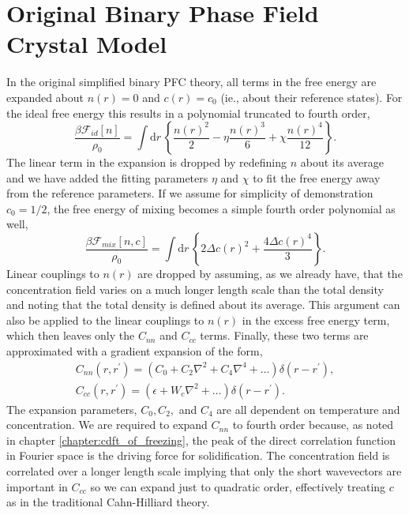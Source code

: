 \documentclass[showkeys, prb, reprint]{revtex4-1}
\renewcommand{\d}{\delta}       %
\newcommand{\F}{\mathcal{F}}    %
\renewcommand{\l}{\left}        %
\renewcommand{\r}{\right}       %
\newcommand{\f}{\frac}          %
\newcommand{\integrate}[1]{\int \mathrm{d}#1\,}
\begin{document}
\section{Original Binary Phase Field Crystal Model} %

In the original simplified binary PFC theory, all terms in the free energy are
expanded about $n(r) = 0$ and $c(r) = c_0$ (ie., about their reference states).
For the ideal free energy this results in a polynomial truncated to fourth
order,
%
\begin{equation}
    \label{ideal_expansion}
    \f{\beta\F_{id}[n]}{\rho_0} = \integrate{r}
    \l\lbrace \f{n(r)^2}{2} - \eta\f{n(r)^3}{6} + \chi\f{n(r)^4}{12} \r\rbrace.
\end{equation}
%
The linear term in the expansion is dropped by redefining $n$ about its average
and we have added the fitting parameters $\eta$ and $\chi$ to fit the free
energy away from the reference parameters. If we assume for simplicity of
demonstration $c_0 = 1/2$, the free energy of mixing becomes a simple fourth
order polynomial as well,
%
\begin{equation}
    \f{\beta\F_{mix}[n, c]}{\rho_0} = \integrate{r} \l\lbrace
       2\Delta c(r)^2 + \f{4\Delta c(r)^4}{3}
    \r\rbrace.
\end{equation}
%
Linear couplings to $n(r)$ are dropped by assuming, as we already have, that
the concentration field varies on a much longer length scale than the total
density and noting that the total density is defined about its average. This
argument can also be applied to the linear couplings to $n(r)$ in the excess free
energy term, which then leaves only the $C_{nn}$ and $C_{cc}$ terms. Finally, these
two terms are approximated with a gradient expansion of the form,
%
\begin{gather}
    C_{nn}(r, r^\prime) = \l( C_0 + C_2 \nabla^2 + C_4 \nabla^4 + \dots\r)
        \d(r - r^\prime), \\
    C_{cc}(r, r^\prime) = \l(\epsilon + W_c \nabla^2 + \dots\r)
        \d(r - r^\prime).
\end{gather}
%
The expansion parameters, $C_0, C_2,$ and $C_4$ are all dependent on
temperature and concentration. We are required to expand $C_{nn}$ to fourth
order because, as noted in chapter \ref{chapter:cdft_of_freezing}, the peak of
the direct correlation function in Fourier space is the driving force for
solidification.  The concentration field is correlated over a longer length
scale implying that only the short wavevectors are important in $C_{cc}$ so we
can expand just to quadratic order, effectively treating $c$ as in the
traditional Cahn-Hilliard theory.
\end{document}
